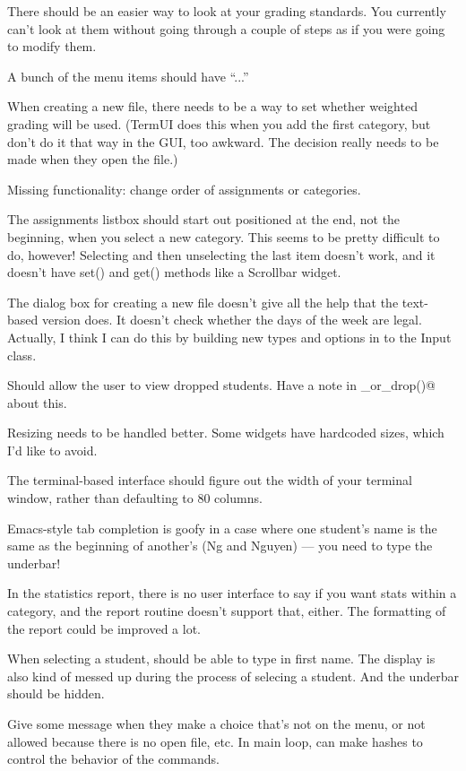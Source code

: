\documentclass{opengrade_doc}
\begin{document}
There should be an easier way to look at your grading standards. You currently
can't look at them without going through a couple of steps as if you were
going to modify them.

A bunch of the menu items should have ``...''

When creating a new file, there needs to be a way to set whether weighted grading
will be used. (TermUI does this when you add the first category, but don't do it
that way in the GUI, too awkward. The decision really needs to be made when they
open the file.) 

Missing functionality: 
change order of assignments or categories.

The assignments listbox should start out positioned
at the end, not the beginning, when you select a new category. This seems to be
pretty difficult to do, however! Selecting and then unselecting the last item
doesn't work, and it doesn't have set() and get() methods like a Scrollbar widget.

The dialog box for creating a new file doesn't give all the
help that the text-based version does. It doesn't check 
 whether the days of the week are legal. Actually, I think
I can do this by building new types and options in to the Input class.

Should allow the user to view dropped students. Have a note in 
\verb@add_or_drop()@
about this.

Resizing needs to be handled better. Some widgets have hardcoded sizes, which
I'd like to avoid.


The terminal-based interface should figure out the width of your terminal
window, rather than defaulting to 80 columns.

Emacs-style tab completion is goofy in a case where one student's name
is the same as the beginning of another's (Ng and Nguyen) --- you need
to type the underbar!

In the statistics report, there is no user interface to say if you want
stats within a category, and the report routine doesn't support that,
either. The formatting of the report could be improved a lot.

When selecting a student, should be able to type in first name.
The display is also kind of messed up during the process of selecing
a student. And the underbar should be hidden.


Give some message when they make a choice that's
not on the menu, or not allowed because there is no open file, etc.
In main loop, can make hashes to control the behavior of the commands.
\end{document}

